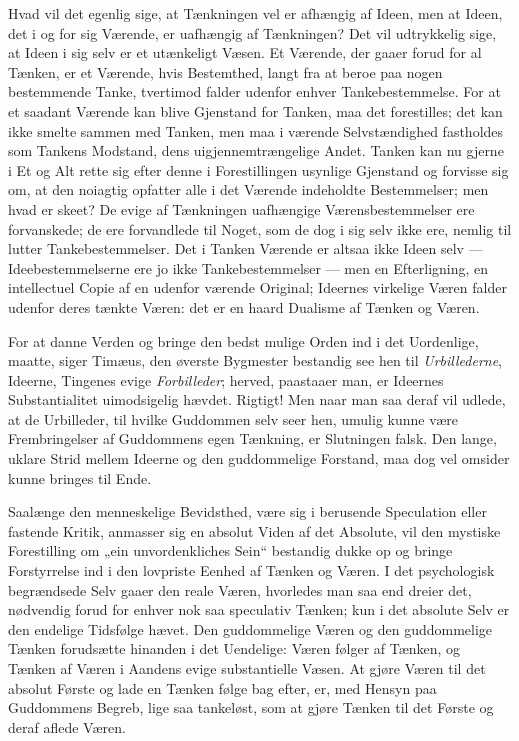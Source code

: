 \documentclass[12pt,a4paper]{book}
\begin{document}
Hvad vil det egenlig sige, at Tænkningen vel er afhængig af Ideen, men at
Ideen, det i og for sig Værende, er uafhængig af Tænkningen? Det vil
udtrykkelig sige, at Ideen i sig selv er et utænkeligt Væsen. Et Værende,
der gaaer forud for al Tænken, er et Værende, hvis Bestemthed, langt fra
at beroe paa nogen bestemmende Tanke, tvertimod falder udenfor enhver
Tankebestemmelse. For at et saadant Værende kan blive Gjenstand for
Tanken, maa det forestilles; det kan ikke smelte sammen med Tanken, men
maa i værende Selvstændighed fastholdes som Tankens Modstand, dens
uigjennemtrængelige Andet. Tanken kan nu gjerne i Et og Alt rette sig
efter denne i Forestillingen usynlige Gjenstand og forvisse sig om, at den
noiagtig opfatter alle
i det Værende indeholdte Bestemmelser; men hvad er skeet? De evige af
Tænkningen uafhængige Værensbestemmelser ere forvanskede; de ere
forvandlede til Noget, som de dog i sig selv ikke ere, nemlig til lutter
Tankebestemmelser. Det i Tanken Værende er altsaa ikke Ideen selv ---
Ideebestemmelserne ere jo ikke Tankebestemmelser --- men en Efterligning,
en intellectuel Copie af en udenfor værende Original; Ideernes virkelige
Væren falder udenfor deres tænkte Væren: det er en haard Dualisme af
Tænken og Væren.

For at danne Verden og bringe den bedst mulige Orden ind i det
Uordenlige, maatte, siger Timæus, den øverste Bygmester bestandig see hen
til \emph{Urbillederne}, Ideerne, Tingenes evige \emph{Forbilleder};
herved, paastaaer man, er Ideernes Substantialitet uimodsigelig hævdet.
Rigtigt! Men naar man saa deraf vil udlede, at de Urbilleder, til hvilke
Guddommen selv seer hen, umulig kunne være Frembringelser af Guddommens
egen Tænkning, er Slutningen falsk. Den lange, uklare Strid mellem Ideerne
og den guddommelige Forstand, maa dog vel omsider kunne bringes til Ende.

Saalænge den menneskelige Bevidsthed, være sig i berusende Speculation
eller fastende Kritik, anmasser sig en absolut Viden af det Absolute, vil
den mystiske Forestilling om „ein unvordenkliches Sein“ bestandig dukke op
og bringe Forstyrrelse ind i den lovpriste Eenhed af Tænken og Væren. I
det psychologisk begrændsede Selv gaaer den reale Væren, hvorledes man saa
end dreier det, nødvendig forud for enhver nok saa speculativ Tænken; kun
i det absolute Selv er den endelige Tidsfølge hævet. Den guddommelige
Væren og den guddommelige Tænken forudsætte hinanden i det Uendelige:
Væren følger af Tænken, og Tænken af Væren i Aandens evige substantielle
Væsen. At gjøre Væren til det absolut Første og lade en Tænken følge bag
efter, er, med Hensyn paa Guddommens Begreb, lige saa tankeløst, som at
gjøre Tænken til det Første og deraf aflede Væren.
\end{document}
